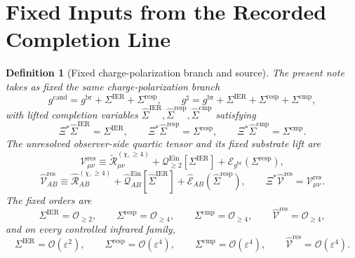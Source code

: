 \documentclass[11pt]{article}
\newcommand{\ObserverMap}{\Xi}
\newcommand{\ObserverMetric}{g^{\mathrm{br}}}
\newcommand{\CandidateMetric}{g^{\mathrm{cand}}}
\newcommand{\CompletedMetric}{g^{\sharp}}
\newcommand{\BaseShift}{\Sigma^{\mathrm{IER}}}
\newcommand{\ResponseShift}{\Sigma^{\mathrm{resp}}}
\newcommand{\CompShift}{\Sigma^{\mathrm{cmp}}}
\newcommand{\BaseLift}{\widehat\Sigma^{\mathrm{IER}}}
\newcommand{\ResponseLift}{\widehat\Sigma^{\mathrm{resp}}}
\newcommand{\CompLift}{\widehat\Sigma^{\mathrm{cmp}}}
\newcommand{\ReLongFour}{\widetilde{\mathcal R}_{\mu\nu}^{(\chi,\ge 4)}}
\newcommand{\ResidualCore}{\mathcal V_{\mu\nu}^{\mathrm{res}}}
\newcommand{\ResidualLift}{\widehat{\mathcal V}^{\mathrm{res}}}
\newcommand{\EinLin}{\mathcal E_{\ObserverMetric}}
\newcommand{\EinQuad}{\mathcal Q_{\ge 2}^{\mathrm{Ein}}}
\newcommand{\epsIR}{\varepsilon}
\newtheorem{definition}{Definition}
\begin{document}
\section{Fixed Inputs from the Recorded Completion Line}

\begin{definition}[Fixed charge-polarization branch and source]
\label{def:fixed}
The present note takes as fixed the same charge-polarization branch
\begin{equation}
\CandidateMetric
=
\ObserverMetric+\BaseShift+\ResponseShift,
\qquad
\CompletedMetric
=
\ObserverMetric+\BaseShift+\ResponseShift+\CompShift,
\label{eq:metrics}
\end{equation}
with lifted completion variables \(\BaseLift,\ResponseLift,\CompLift\) satisfying
\begin{equation}
\ObserverMap^*\BaseLift=\BaseShift,
\qquad
\ObserverMap^*\ResponseLift=\ResponseShift,
\qquad
\ObserverMap^*\CompLift=\CompShift.
\label{eq:lifts}
\end{equation}
The unresolved observer-side quartic tensor and its fixed substrate lift are
\begin{equation}
\ResidualCore
\equiv
\ReLongFour
+\EinQuad[\BaseShift]
+\EinLin(\ResponseShift),
\label{eq:vres}
\end{equation}
\begin{equation}
\ResidualLift_{AB}
\equiv
\widehat{\mathcal R}_{AB}^{(\chi,\ge 4)}
+\widehat{\mathcal Q}_{AB}^{\mathrm{Ein}}[\BaseLift]
+\widehat{\mathcal E}_{AB}(\ResponseLift),
\qquad
\ObserverMap^*\ResidualLift=\ResidualCore.
\label{eq:liftedsource}
\end{equation}
The fixed orders are
\begin{equation}
\BaseShift=\mathcal O_{\ge 2},
\qquad
\ResponseShift=\mathcal O_{\ge 4},
\qquad
\CompShift=\mathcal O_{\ge 4},
\qquad
\ResidualLift=\mathcal O_{\ge 4},
\label{eq:orders}
\end{equation}
and on every controlled infrared family,
\begin{equation}
\BaseShift=\mathcal O(\epsIR^2),
\qquad
\ResponseShift=\mathcal O(\epsIR^4),
\qquad
\CompShift=\mathcal O(\epsIR^4),
\qquad
\ResidualLift=\mathcal O(\epsIR^4).
\label{eq:irorders}
\end{equation}
\end{definition}
\end{document}
